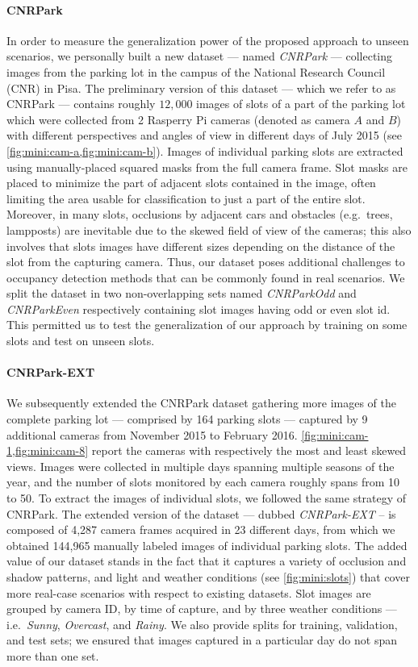 \paragraph{CNRPark}
In order to measure the generalization power of the proposed approach to unseen scenarios, we personally built a new dataset --- named \emph{CNRPark} --- collecting images from the parking lot in the campus of the National Research Council (CNR) in Pisa.
The preliminary version of this dataset --- which we refer to as CNRPark --- contains roughly $12,000$ images of slots of a part of the parking lot which were collected from 2 Rasperry Pi cameras (denoted as camera $A$ and $B$) with different perspectives and angles of view in different days of July 2015 (see \ref{fig:mini:cam-a,fig:mini:cam-b}).
Images of individual parking slots are extracted using manually-placed squared masks from the full camera frame.
Slot masks are placed to minimize the part of adjacent slots contained in the image, often limiting the area usable for classification to just a part of the entire slot.
Moreover, in many slots, occlusions by adjacent cars and obstacles (e.g.\ trees, lampposts) are inevitable due to the skewed field of view of the cameras;
this also involves that slots images have different sizes depending on the distance of the slot from the capturing camera.
Thus, our dataset poses additional challenges to occupancy detection methods that can be commonly found in real scenarios.
We split the dataset in two non-overlapping sets named \emph{CNRParkOdd} and \emph{CNRParkEven} respectively containing slot images having odd or even slot id.
This permitted us to test the generalization of our approach by training on some slots and test on unseen slots.

\paragraph{CNRPark-EXT}
We subsequently extended the CNRPark dataset gathering more images of the complete parking lot --- comprised by 164 parking slots --- captured by 9 additional cameras from November 2015 to February 2016.
\ref{fig:mini:cam-1,fig:mini:cam-8} report the cameras with respectively the most and least skewed views.
Images were collected in multiple days spanning multiple seasons of the year, and the number of slots monitored by each camera roughly spans from 10 to 50.
To extract the images of individual slots, we followed the same strategy of CNRPark.
The extended version of the dataset --- dubbed \emph{CNRPark-EXT} -- is composed of 4,287 camera frames acquired in 23 different days, from which we obtained 144,965 manually labeled images of individual parking slots.
The added value of our dataset stands in the fact that it captures a variety of occlusion and shadow patterns, and light and weather conditions (see \ref{fig:mini:slots}) that cover more real-case scenarios with respect to existing datasets.
Slot images are grouped by camera ID, by time of capture, and by three weather conditions --- i.e.\ \emph{Sunny}, \emph{Overcast}, and \emph{Rainy}.
We also provide splits for training, validation, and test sets;
we ensured that images captured in a particular day do not span more than one set.

